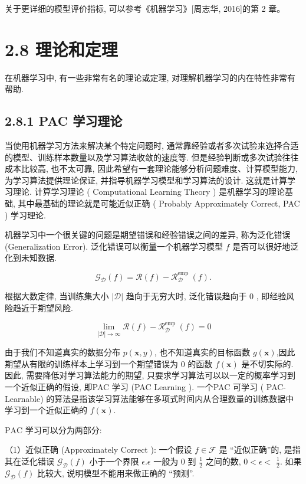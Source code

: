 \documentclass[10pt]{article}
\begin{document}
关于更详细的模型评价指标, 可以参考《机器学习》[周志华, 2016]的第 2 章。

\section*{2.8 理论和定理}
在机器学习中, 有一些非常有名的理论或定理, 对理解机器学习的内在特性非常有帮助.

\subsection*{2.8.1 PAC 学习理论}
当使用机器学习方法来解决某个特定问题时, 通常靠经验或者多次试验来选择合适的模型、训练样本数量以及学习算法收敛的速度等. 但是经验判断或多次试验往往成本比较高, 也不太可靠, 因此希望有一套理论能够分析问题难度、计算模型能力, 为学习算法提供理论保证, 并指导机器学习模型和学习算法的设计. 这就是计算学习理论. 计算学习理论 ( Computational Learning Theory ) 是机器学习的理论基础, 其中最基础的理论就是可能近似正确 ( Probably Approximately Correct, PAC ) 学习理论.

机器学习中一个很关键的问题是期望错误和经验错误之间的差异, 称为泛化错误 (Generalization Error). 泛化错误可以衡量一个机器学习模型 $f$ 是否可以很好地泛化到未知数据.


\begin{equation*}
\mathcal{G}_{\mathcal{D}}(f)=\mathcal{R}(f)-\mathcal{R}_{\mathcal{D}}^{\text {emp }}(f) . \tag{2.85}
\end{equation*}


根据大数定律, 当训练集大小 $|\mathcal{D}|$ 趋向于无穷大时, 泛化错误趋向于 0 , 即经验风险趋近于期望风险.


\begin{equation*}
\lim _{|\mathcal{D}| \rightarrow \infty} \mathcal{R}(f)-\mathcal{R}_{\mathcal{D}}^{\text {emp }}(f)=0 \tag{2.86}
\end{equation*}


由于我们不知道真实的数据分布 $p(\boldsymbol{x}, y)$, 也不知道真实的目标函数 $g(\boldsymbol{x})$,因此期望从有限的训练样本上学习到一个期望错误为 0 的函数 $f(\boldsymbol{x})$ 是不切实际的. 因此, 需要降低对学习算法能力的期望, 只要求学习算法可以以一定的概率学习到一个近似正确的假设, 即PAC 学习 (PAC Learning ). 一个PAC 可学习 ( PAC-Learnable) 的算法是指该学习算法能够在多项式时间内从合理数量的训练数据中学习到一个近似正确的 $f(\boldsymbol{x})$.

$\mathrm{PAC}$ 学习可以分为两部分:

（1）近似正确 (Approximately Correct ): 一个假设 $f \in \mathcal{F}$ 是 “近似正确”的, 是指其在泛化错误 $\mathcal{G}_{\mathcal{D}}(f)$ 小于一个界限 $\epsilon . \epsilon$ 一般为 0 到 $\frac{1}{2}$ 之间的数, $0<\epsilon<$ $\frac{1}{2}$. 如果 $\mathcal{G}_{\mathcal{D}}(f)$ 比较大, 说明模型不能用来做正确的 “预测”.
\end{document}

